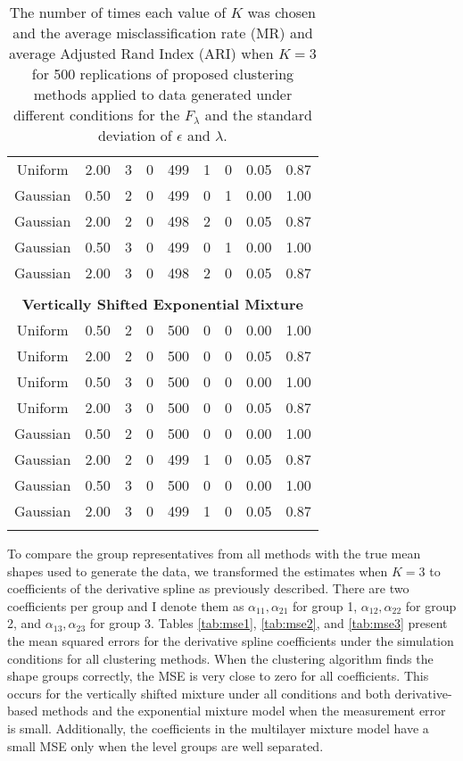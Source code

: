 \begin{table}[ht]
\begin{tabular}{ccc|cccccc}
  Uniform & 2.00 &   3 & 0 & 499 & 1 & 0 & 0.05 & 0.87 \\ 
  Gaussian & 0.50 &   2 & 0 & 499 & 0 & 1 & 0.00 & 1.00 \\ 
  Gaussian & 2.00 &   2 & 0 & 498 & 2 & 0 & 0.05 & 0.87 \\ 
  Gaussian & 0.50 &   3 & 0 & 499 & 0 & 1 & 0.00 & 1.00 \\ 
  Gaussian & 2.00 &   3 & 0 & 498 & 2 & 0 & 0.05 & 0.87 \\ 
   \\ \multicolumn{9}{c}{\textbf{Vertically Shifted Exponential Mixture}}\\Uniform & 0.50 &   2 & 0 & 500 & 0 & 0 & 0.00 & 1.00 \\ 
  Uniform & 2.00 &   2 & 0 & 500 & 0 & 0 & 0.05 & 0.87 \\ 
  Uniform & 0.50 &   3 & 0 & 500 & 0 & 0 & 0.00 & 1.00 \\ 
  Uniform & 2.00 &   3 & 0 & 500 & 0 & 0 & 0.05 & 0.87 \\ 
  Gaussian & 0.50 &   2 & 0 & 500 & 0 & 0 & 0.00 & 1.00 \\ 
  Gaussian & 2.00 &   2 & 0 & 499 & 1 & 0 & 0.05 & 0.87 \\ 
  Gaussian & 0.50 &   3 & 0 & 500 & 0 & 0 & 0.00 & 1.00 \\ 
  Gaussian & 2.00 &   3 & 0 & 499 & 1 & 0 & 0.05 & 0.87 \\ 
   \thickhline\end{tabular}
\caption{The number of times each value of $K$ was chosen and the average misclassification rate (MR) and average Adjusted Rand Index (ARI) when $K=3$ for 500 replications of proposed clustering methods applied to data generated under different conditions for the $F_{\lambda}$ and the standard deviation of $\epsilon$ and $\lambda$.}
\label{tab:freq3}

\end{table}
To compare the group representatives from all methods with the true mean shapes used to generate the data, we transformed the estimates when $K=3$ to coefficients of the derivative spline as previously described. There are two coefficients per group and I denote them as $\alpha_{11},\alpha_{21}$ for group 1, $\alpha_{12},\alpha_{22}$ for group 2, and $\alpha_{13},\alpha_{23}$ for group 3. Tables \ref{tab:mse1}, \ref{tab:mse2}, and \ref{tab:mse3} present the mean squared errors for the derivative spline coefficients under the simulation conditions for all clustering methods. When the clustering algorithm finds the shape groups correctly, the MSE is very close to zero for all coefficients. This occurs for the vertically shifted mixture under all conditions and both derivative-based methods and the exponential mixture model when the measurement error is small. Additionally, the coefficients in the multilayer mixture model have a small MSE only when the level groups are well separated.

